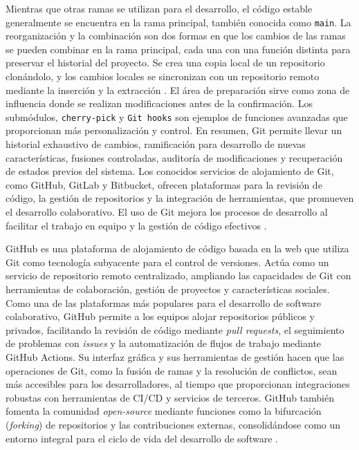 Mientras que otras ramas se utilizan para el desarrollo, el código estable 
generalmente se encuentra en la rama principal, también conocida como \texttt{main}. 
La reorganización y la combinación son dos formas en que los cambios de las ramas 
se pueden combinar en la rama principal, cada una con una función distinta para 
preservar el historial del proyecto. Se crea una copia local de un repositorio 
clonándolo, y los cambios locales se sincronizan con un repositorio remoto mediante 
la inserción y la extracción \citep{ghodke2024git}. El área de preparación sirve como 
zona de influencia donde se realizan modificaciones antes de la confirmación. Los 
submódulos, \texttt{cherry-pick} y \texttt{Git hooks} son ejemplos de funciones 
avanzadas que proporcionan más personalización y control. En resumen, 
Git permite llevar un historial exhaustivo de cambios, ramificación para
desarrollo de nuevas características, fusiones controladas, auditoría de
modificaciones y recuperación de estados previos del sistema.
Los conocidos servicios de 
alojamiento de Git, como GitHub, GitLab y Bitbucket, ofrecen plataformas para la 
revisión de código, la gestión de repositorios y la integración de herramientas, que 
promueven el desarrollo colaborativo. El uso de Git mejora los procesos de desarrollo 
al facilitar el trabajo en equipo y la gestión de código efectivos 
\citep{ponuthorai2022git}.
        
GitHub es una plataforma de alojamiento de código basada en la web que utiliza Git 
como tecnología subyacente para el control de versiones. Actúa como un servicio de 
repositorio remoto centralizado, ampliando las capacidades de Git con herramientas 
de colaboración, gestión de proyectos y características sociales. Como una de las 
plataformas más populares para el desarrollo de software colaborativo, GitHub permite 
a los equipos alojar repositorios públicos y privados, facilitando la revisión de 
código mediante \textit{pull requests}, el seguimiento de problemas con \textit{issues} 
y la automatización de flujos de trabajo mediante GitHub Actions. Su interfaz gráfica 
y sus herramientas de gestión hacen que las operaciones de Git, como la fusión de ramas 
y la resolución de conflictos, sean más accesibles para los desarrolladores, al tiempo 
que proporcionan integraciones robustas con herramientas de \ac{CI/CD} y servicios de 
terceros. GitHub también fomenta la comunidad \textit{open-source} mediante funciones 
como la bifurcación (\textit{forking}) de repositorios y las contribuciones externas, 
consolidándose como un entorno integral para el ciclo de vida del desarrollo de software 
\citep{github2024, ghodke2024git}.
    
